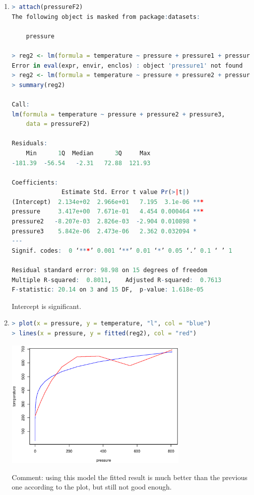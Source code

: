 \documentclass{article}
\begin{document}
\begin{enumerate}[leftmargin = 0 em, label = \arabic*., font = \bfseries]
\begin{enumerate}
\item 
\begin{lstlisting}[language = R]
> attach(pressureF2)
The following object is masked from package:datasets:

    pressure

> reg2 <- lm(formula = temperature ~ pressure + pressure1 + pressure2, data = pressureF2)
Error in eval(expr, envir, enclos) : object 'pressure1' not found
> reg2 <- lm(formula = temperature ~ pressure + pressure2 + pressure3, data = pressureF2)
> summary(reg2)

Call:
lm(formula = temperature ~ pressure + pressure2 + pressure3, 
    data = pressureF2)

Residuals:
    Min      1Q  Median      3Q     Max 
-181.39  -56.54   -2.31   72.88  121.93 

Coefficients:
              Estimate Std. Error t value Pr(>|t|)    
(Intercept)  2.134e+02  2.966e+01   7.195  3.1e-06 ***
pressure     3.417e+00  7.671e-01   4.454 0.000464 ***
pressure2   -8.207e-03  2.826e-03  -2.904 0.010898 *  
pressure3    5.842e-06  2.473e-06   2.362 0.032094 *  
---
Signif. codes:  0 ‘***’ 0.001 ‘**’ 0.01 ‘*’ 0.05 ‘.’ 0.1 ‘ ’ 1

Residual standard error: 98.98 on 15 degrees of freedom
Multiple R-squared:  0.8011,	Adjusted R-squared:  0.7613 
F-statistic: 20.14 on 3 and 15 DF,  p-value: 1.618e-05

\end{lstlisting}
Intercept is significant.

\item 
\begin{lstlisting}[language = R]
> plot(x = pressure, y = temperature, "l", col = "blue")
> lines(x = pressure, y = fitted(reg2), col = "red")
\end{lstlisting}
\begin{center}
\includegraphics[width = 0.7\textwidth]{reg2.eps}
\end{center}
Comment: using this model the fitted result is much better than the previous one according to the plot, but still not good enough.


\end{enumerate}
\end{enumerate}
\end{document}
